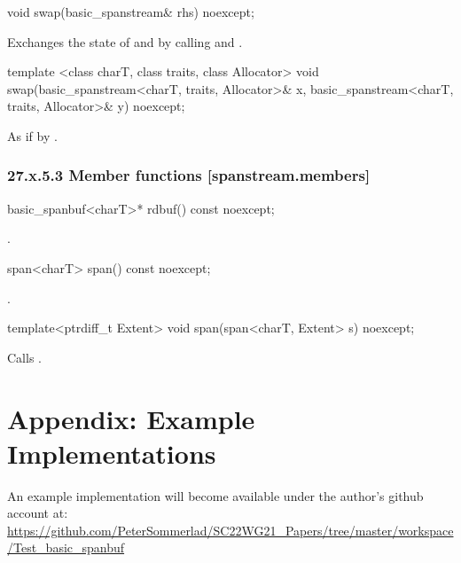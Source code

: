 \documentclass[ebook,11pt,article]{memoir}
\begin{document}
\begin{itemdecl}
void swap(basic_spanstream& rhs) noexcept;
\end{itemdecl}

\begin{itemdescr}
\pnum
\effects Exchanges the state of  and
 by calling
 and
.
\end{itemdescr}


\begin{itemdecl}
template <class charT, class traits, class Allocator>
  void swap(basic_spanstream<charT, traits, Allocator>& x,
            basic_spanstream<charT, traits, Allocator>& y) noexcept;
\end{itemdecl}

\begin{itemdescr}
\pnum
\effects As if by .
\end{itemdescr}

\subsection{27.x.5.3 Member functions [spanstream.members]}
\label{spanstream.members}

\begin{itemdecl}
basic_spanbuf<charT>* rdbuf() const noexcept;
\end{itemdecl}

\begin{itemdescr}
\pnum
\returns
{}.
\end{itemdescr}

\begin{itemdecl}
span<charT> span() const noexcept;
\end{itemdecl}

\begin{itemdescr}
\pnum
\returns
{}.
\end{itemdescr}

\begin{itemdecl}
template<ptrdiff_t Extent>
void span(span<charT, Extent> s) noexcept;
\end{itemdecl}

\begin{itemdescr}
\pnum
\effects
Calls
.
\end{itemdescr}



\chapter{Appendix: Example Implementations}
An example implementation will become available under the author's github account at:
\url{https://github.com/PeterSommerlad/SC22WG21_Papers/tree/master/workspace/Test_basic_spanbuf}
\end{document}
